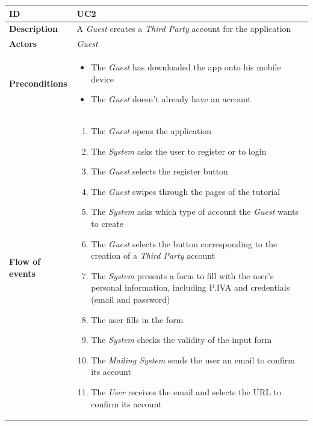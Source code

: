 \documentclass[titlepage]{article}
\begin{document}
			\begin{longtable}{| p{3 cm} | p{10 cm} |} 
			\hline
			{\bf ID} & UC2 \\
			\hline
			{\bf Description} & A {\it {\it Guest}} creates a {\it Third Party} account for the application \\
			\hline
			{\bf Actors} & {\it {\it Guest}} \\
			\hline
			{\bf Preconditions} & 		
							\begin{itemize}
								\item The {\it {\it Guest}}  has downloaded the app onto his mobile device
								\item The {\it {\it Guest}}  doesn’t already have an account
							\end{itemize}
			\\
			\hline
			{\bf Flow of events} & 
							\begin{enumerate}
								\item The {\it {\it Guest}} opens the application
								\item The {\it System} asks the user to register or to login
								\item The {\it {\it Guest}} selects the register button
								\item The {\it {\it Guest}} swipes through the pages of the tutorial
								\item The {\it System}  asks which type of account the {\it {\it Guest}} wants to create
								\item The {\it {\it Guest}} selects the button corresponding to the creation of a {\it Third Party} account
								\item The {\it System}  presents a form to fill with the user’s personal information, including P.IVA and credentials (email and password) 
								\item The user fills in the form
								\item The {\it System}  checks the validity of the input form
								\item The {\it Mailing {\it System}} sends the user an email to confirm its account
								\item The {\it User} receives the email and selects the URL to confirm its account
							\end{enumerate}
			

\end{longtable}
\end{document}

